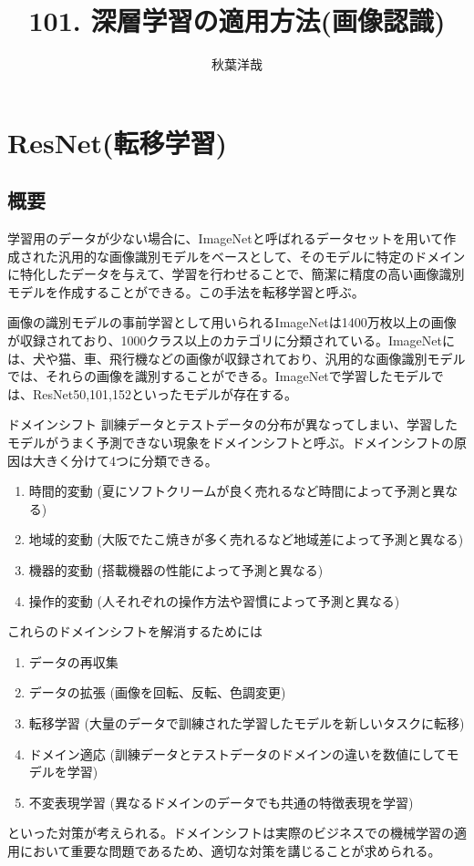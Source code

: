 \documentclass{ltjsarticle}
\begin{document}
\title{101. 深層学習の適用方法(画像認識)}
\author{秋葉洋哉}
\maketitle

\section{ResNet(転移学習)}
\subsection{概要}
学習用のデータが少ない場合に、ImageNetと呼ばれるデータセットを用いて作成された汎用的な画像識別モデルをベースとして、そのモデルに特定のドメインに特化したデータを与えて、学習を行わせることで、簡潔に精度の高い画像識別モデルを作成することができる。この手法を転移学習と呼ぶ。
\par
画像の識別モデルの事前学習として用いられるImageNetは1400万枚以上の画像が収録されており、1000クラス以上のカテゴリに分類されている。ImageNetには、犬や猫、車、飛行機などの画像が収録されており、汎用的な画像識別モデルでは、それらの画像を識別することができる。ImageNetで学習したモデルでは、ResNet50,101,152といったモデルが存在する。

\begin{itembox}{ドメインシフト}
  訓練データとテストデータの分布が異なってしまい、学習したモデルがうまく予測できない現象をドメインシフトと呼ぶ。ドメインシフトの原因は大きく分けて4つに分類できる。
  \begin{enumerate}
    \item 時間的変動 (夏にソフトクリームが良く売れるなど時間によって予測と異なる)
    \item 地域的変動 (大阪でたこ焼きが多く売れるなど地域差によって予測と異なる)
    \item 機器的変動 (搭載機器の性能によって予測と異なる)
    \item 操作的変動 (人それぞれの操作方法や習慣によって予測と異なる)
  \end{enumerate}
  これらのドメインシフトを解消するためには
  \begin{enumerate}
    \item データの再収集
    \item データの拡張 (画像を回転、反転、色調変更)
    \item 転移学習 (大量のデータで訓練された学習したモデルを新しいタスクに転移)
    \item ドメイン適応 (訓練データとテストデータのドメインの違いを数値にしてモデルを学習)
    \item 不変表現学習 (異なるドメインのデータでも共通の特徴表現を学習)
  \end{enumerate}
  といった対策が考えられる。ドメインシフトは実際のビジネスでの機械学習の適用において重要な問題であるため、適切な対策を講じることが求められる。
\end{itembox}
\end{document}

